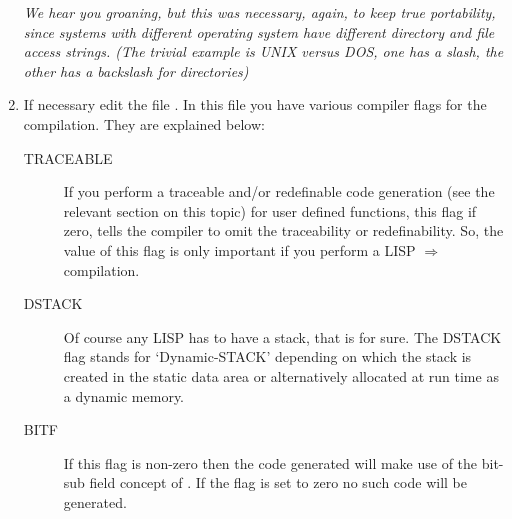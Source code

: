 \begin{enumerate}
      {\em We hear you groaning, but this was necessary, again, to
           keep  true  portability,  since  systems with different operating
           system have different directory and file access strings.
           (The trivial example is UNIX versus DOS, one has  a  slash,  the
            other has a backslash for directories)
      }
\item
      If  necessary  edit  the  file  . In this file you have
      various compiler flags for the \C compilation. They are explained below:
        \begin{description}
 \item[TRACEABLE] If you perform a traceable and/or redefinable
                          code generation (see the relevant section
                          on this topic) for user defined functions,
                          this \C flag if zero, tells the \C compiler
                          to omit the traceability or redefinability.
                          So, the value of this flag is only important
                          if you perform a LISP $\Rightarrow$ \C compilation.
 \item[DSTACK]    Of course any LISP has to have a stack, that
                          is for sure. The DSTACK \C flag stands for
                          `Dynamic-STACK' depending on which the stack
                          is   created   in   the   static   data  area  or
                          alternatively allocated at run time as a dynamic
                          memory.
 \item[BITF]      If this flag is non-zero then the code generated
                          will make use of the bit-sub field  concept
                          of \CC. If the flag is set to zero no such code
                          will be generated.


\end{description}
\end{enumerate}
